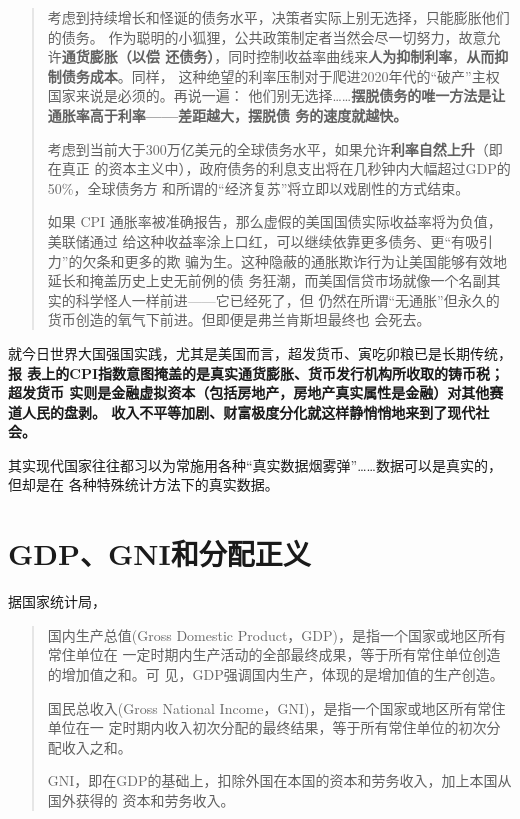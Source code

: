 \begin{quotation}
  考虑到持续增长和怪诞的债务水平，决策者实际上别无选择，只能膨胀他们的债务。
  作为聪明的小狐狸，公共政策制定者当然会尽一切努力，故意允许\textbf{通货膨胀（以偿
    还债务）}，同时控制收益率曲线来\textbf{人为抑制利率}，\textbf{从而抑制债务成本}。同样，
  这种绝望的利率压制对于爬进2020年代的“破产”主权国家来说是必须的。再说一遍：
  他们别无选择……\textbf{摆脱债务的唯一方法是让通胀率高于利率——差距越大，摆脱债
    务的速度就越快。}

  考虑到当前大于300万亿美元的全球债务水平，如果允许\textbf{利率自然上升}（即在真正
  的资本主义中），政府债务的利息支出将在几秒钟内大幅超过GDP的50\%，全球债务方
  和所谓的“经济复苏”将立即以戏剧性的方式结束。

  如果 CPI 通胀率被准确报告，那么虚假的美国国债实际收益率将为负值，美联储通过
  给这种收益率涂上口红，可以继续依靠更多债务、更“有吸引力”的欠条和更多的欺
  骗为生。这种隐蔽的通胀欺诈行为让美国能够有效地延长和掩盖历史上史无前例的债
  务狂潮，而美国信贷市场就像一个名副其实的科学怪人一样前进——它已经死了，但
  仍然在所谓“无通胀”但永久的货币创造的氧气下前进。但即便是弗兰肯斯坦最终也
  会死去。
\end{quotation}

就今日世界大国强国实践，尤其是美国而言，超发货币、寅吃卯粮已是长期传统，\textbf{报
  表上的CPI指数意图掩盖的是真实通货膨胀、货币发行机构所收取的铸币税；超发货币
  实则是金融虚拟资本（包括房地产，房地产真实属性是金融）对其他赛道人民的盘剥。
  收入不平等加剧、财富极度分化就这样静悄悄地来到了现代社会。}

其实现代国家往往都习以为常施用各种“真实数据烟雾弹”……数据可以是真实的，但却是在
各种特殊统计方法下的真实数据。


\section{GDP、GNI和分配正义}
\label{sec:gdp}

据国家统计局，

\begin{quotation}
  国内生产总值(Gross Domestic Product，GDP)，是指一个国家或地区所有常住单位在
  一定时期内生产活动的全部最终成果，等于所有常住单位创造的增加值之和。可
  见，GDP强调国内生产，体现的是增加值的生产创造。


  国民总收入(Gross National Income，GNI)，是指一个国家或地区所有常住单位在一
  定时期内收入初次分配的最终结果，等于所有常住单位的初次分配收入之和。

  GNI，即在GDP的基础上，扣除外国在本国的资本和劳务收入，加上本国从国外获得的
  资本和劳务收入。
\end{quotation}

